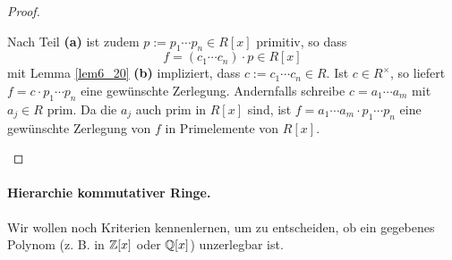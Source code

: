 \begin{proof}
\begin{enumerate}[label=(\alph*)]
		Nach Teil \textbf{(a)} ist zudem $p := p_1 \cdots p_n \in R[x]$ primitiv, so dass 
		\[f = (c_1 \cdots c_n) \cdot p \in R[x]\]
		mit Lemma \ref{lem6_20} \textbf{(b)} impliziert, dass $c := c_1 \cdots c_n \in R$. Ist $c \in R^\times$, so liefert $f = c\cdot p_1 \cdots p_n$ eine gewünschte Zerlegung. Andernfalls schreibe $c = a_1 \cdots a_m$ mit $a_j \in R$ prim. Da die $a_j$ auch prim in $R[x]$ sind, ist $f = a_1 \cdots a_m \cdot p_1 \cdots p_n$ eine gewünschte Zerlegung von $f$ in Primelemente von $R[x]$.
	\end{enumerate}
\end{proof}
\paragraph{Hierarchie kommutativer Ringe. }


Wir wollen noch Kriterien kennenlernen, um zu entscheiden, ob ein gegebenes Polynom (z. B. in $\mathbb{Z}[x]$ oder $\mathbb{Q}[x]$) unzerlegbar ist.


